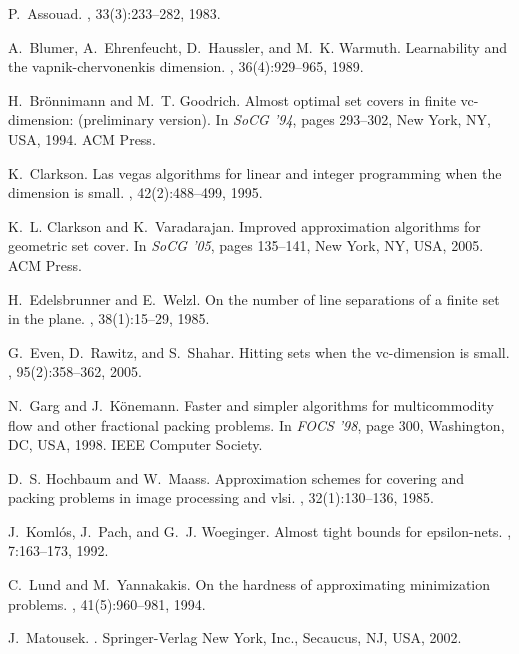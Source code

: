 \documentclass{stacs_proc}
\begin{document}
\vskip-0.3cm
\begin{thebibliography}{10}

P.~Assouad.
, 33(3):233--282, 1983.

A.~Blumer, A.~Ehrenfeucht, D.~Haussler, and M.~K. Warmuth.
\newblock Learnability and the vapnik-chervonenkis dimension.
, 36(4):929--965, 1989.

H.~Br\"{o}nnimann and M.~T. Goodrich.
\newblock Almost optimal set covers in finite vc-dimension: (preliminary
  version).
\newblock In {\em SoCG '94}, pages 293--302, New York, NY, USA, 1994. ACM
  Press.

K.~Clarkson.
\newblock Las vegas algorithms for linear and integer programming when the
  dimension is small.
, 42(2):488--499, 1995.

K.~L. Clarkson and K.~Varadarajan.
\newblock Improved approximation algorithms for geometric set cover.
\newblock In {\em SoCG '05}, pages 135--141, New York, NY, USA, 2005. ACM
  Press.

H.~Edelsbrunner and E.~Welzl.
\newblock On the number of line separations of a finite set in the plane.
, 38(1):15--29, 1985.

G.~Even, D.~Rawitz, and S.~Shahar.
\newblock Hitting sets when the vc-dimension is small.
, 95(2):358--362, 2005.

N.~Garg and J.~K\"{o}nemann.
\newblock Faster and simpler algorithms for multicommodity flow and other
  fractional packing problems.
\newblock In {\em FOCS '98}, page 300, Washington, DC, USA, 1998. IEEE Computer
  Society.

D.~S. Hochbaum and W.~Maass.
\newblock Approximation schemes for covering and packing problems in image
  processing and vlsi.
, 32(1):130--136, 1985.

J.~Koml\'{o}s, J.~Pach, and G.~J. Woeginger.
\newblock Almost tight bounds for epsilon-nets.
, 7:163--173, 1992.

C.~Lund and M.~Yannakakis.
\newblock On the hardness of approximating minimization problems.
, 41(5):960--981, 1994.

J.~Matousek.
.
\newblock Springer-Verlag New York, Inc., Secaucus, NJ, USA, 2002.


\end{thebibliography}
\end{document}
